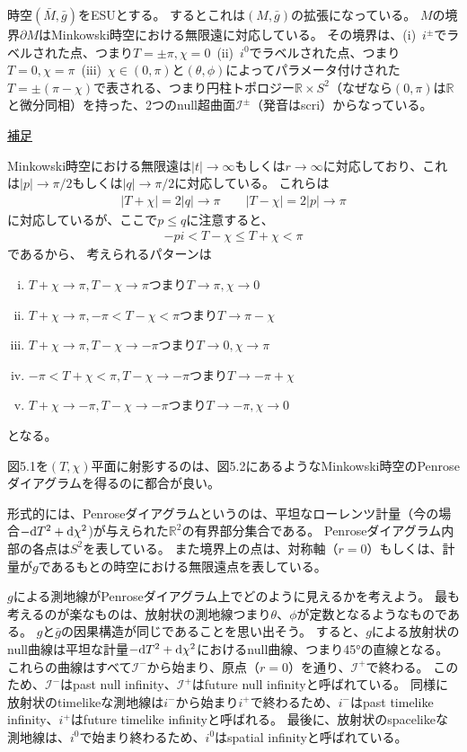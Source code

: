 \documentclass[a4paper, 12pt]{jsarticle}
\newcommand{\ddif}{{\rm d}}
\begin{document}
時空$(\bar{M}, \bar{g})$をESUとする。
するとこれは$(M, \bar{g})$の拡張になっている。
$M$の境界$\partial M$はMinkowski時空における無限遠に対応している。
その境界は、(i)\ $i^{\pm}$でラベルされた点、つまり$T=\pm \pi, \chi=0$\ (ii)\ $i^0$でラベルされた点、つまり$T=0, \chi=\pi$\ (iii)\ $\chi \in (0, \pi)$と$(\theta, \phi)$によってパラメータ付けされた$T=\pm(\pi - \chi)$で表される、つまり円柱トポロジー$\mathbb{R} \times S^2$（なぜなら$(0, \pi)$は$\mathbb{R}$と微分同相）を持った、2つのnull超曲面$\mathcal{I}^{\pm}$（発音はscri）からなっている。
\begin{screen}
	\underline{補足}

	Minkowski時空における無限遠は$|t| \to \infty$もしくは$r \to \infty$に対応しており、これは$|p| \to \pi/2$もしくは$|q| \to \pi/2$に対応している。
	これらは
	\begin{align}
		|T + \chi| = 2|q| \to \pi \qquad |T - \chi| = 2|p| \to \pi
	\end{align}
	に対応しているが、ここで$p \le q$に注意すると、
	\begin{align}
		-pi < T - \chi \le T + \chi < \pi
	\end{align}
	であるから、
	考えられるパターンは
	\begin{enumerate}[(i)]
		\item $T + \chi \to \pi, T - \chi \to \pi$つまり$T \to \pi, \chi \to 0$
		\item $T + \chi \to \pi, -\pi < T - \chi < \pi$つまり$T \to \pi - \chi$
		\item $T + \chi \to \pi, T - \chi \to -\pi$つまり$T \to 0, \chi \to \pi$
		\item $-\pi < T + \chi < \pi, T - \chi \to -\pi$つまり$T \to -\pi + \chi$
		\item $T + \chi \to -\pi, T - \chi \to -\pi$つまり$T \to -\pi, \chi \to 0$
	\end{enumerate}
	となる。
\end{screen}

図5.1を$(T, \chi)$平面に射影するのは、図5.2にあるようなMinkowski時空のPenroseダイアグラムを得るのに都合が良い。

形式的には、Penroseダイアグラムというのは、平坦なローレンツ計量（今の場合$-\ddif T^2 + \ddif \chi^2$)が与えられた$\mathbb{R}^2$の有界部分集合である。
Penroseダイアグラム内部の各点は$S^2$を表している。
また境界上の点は、対称軸（$r=0$）もしくは、計量が$g$であるもとの時空における無限遠点を表している。

$g$による測地線がPenroseダイアグラム上でどのように見えるかを考えよう。
最も考えるのが楽なものは、放射状の測地線つまり$\theta$、$\phi$が定数となるようなものである。
$g$と$\bar{g}$の因果構造が同じであることを思い出そう。
すると、$g$による放射状のnull曲線は平坦な計量$-\ddif T^2 + \ddif \chi^2$におけるnull曲線、つまり45°の直線となる。
これらの曲線はすべて$\mathcal{I}^-$から始まり、原点（$r=0$）を通り、$\mathcal{I}^+$で終わる。
このため、$\mathcal{I}^-$はpast null infinity、$\mathcal{I}^+$はfuture null infinityと呼ばれている。
同様に放射状のtimelikeな測地線は$i^-$から始まり$i^+$で終わるため、$i^-$はpast timelike infinity、$i^+$はfuture timelike infinityと呼ばれる。
最後に、放射状のspacelikeな測地線は、$i^0$で始まり終わるため、$i^0$はspatial infinityと呼ばれている。
\end{document}
